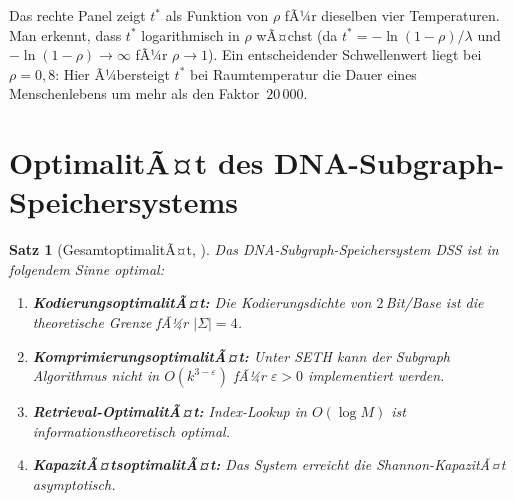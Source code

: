 ﻿\documentclass[a4paper,12pt]{article}
\theoremstyle{definition}
\theoremstyle{plain}
\newtheorem{satz}{Satz}[section]
\begin{document}
Das rechte Panel zeigt $t^*$ als Funktion von $\rho$ fÃ¼r dieselben vier
Temperaturen.  Man erkennt, dass $t^*$ logarithmisch in $\rho$ wÃ¤chst
(da $t^* = -\ln(1-\rho)/\lambda$ und $-\ln(1-\rho) \to \infty$ fÃ¼r
$\rho \to 1$).  Ein entscheidender Schwellenwert liegt bei $\rho = 0{,}8$:
Hier Ã¼bersteigt $t^*$ bei Raumtemperatur die Dauer eines Menschenlebens
um mehr als den Faktor~$20\,000$.

\section{OptimalitÃ¤t des DNA-Subgraph-Speichersystems}
\label{sec:optimalitaet}

\begin{satz}[GesamtoptimalitÃ¤t, \cite{dnastor}]
\label{satz:optimalitaet}
  Das DNA-Subgraph-Speichersystem DSS ist in folgendem Sinne optimal:
  \begin{enumerate}
    \item \textbf{KodierungsoptimalitÃ¤t:} Die Kodierungsdichte von
          $2$\,Bit/Base ist die theoretische Grenze fÃ¼r $|\Sigma|=4$.
    \item \textbf{KomprimierungsoptimalitÃ¤t:} Unter SETH kann der
          Subgraph Algorithmus nicht in $O(k^{3-\varepsilon})$ fÃ¼r
          $\varepsilon > 0$ implementiert werden.
    \item \textbf{Retrieval-OptimalitÃ¤t:} Index-Lookup in $O(\log M)$
          ist informationstheoretisch optimal.
    \item \textbf{KapazitÃ¤tsoptimalitÃ¤t:} Das System erreicht die
          Shannon-KapazitÃ¤t asymptotisch.
  \end{enumerate}
\end{satz}
\end{document}
